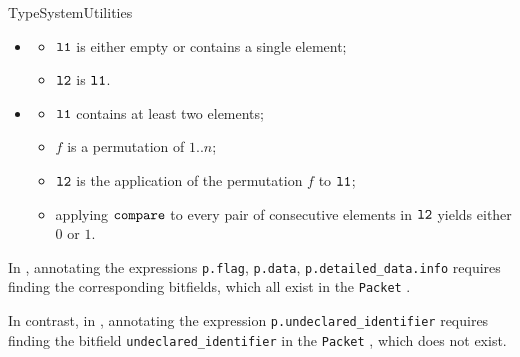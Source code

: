 \begin{TypingRuleList}{TypeSystemUtilities}
\ProseParagraph
\OneApplies
\begin{itemize}
  \item {}
  \begin{itemize}
    \item $\texttt{l1}$ is either empty or contains a single element;
    \item $\texttt{l2}$ is $\texttt{l1}$.
  \end{itemize}

  \item {}
  \begin{itemize}
    \item $\texttt{l1}$ contains at least two elements;
    \item $f$ is a permutation of $1..n$;
    \item $\texttt{l2}$ is the application of the permutation $f$ to $\texttt{l1}$;
    \item applying $\texttt{compare}$ to every pair of consecutive elements in $\texttt{l2}$ yields either $0$ or $1$.
  \end{itemize}
\end{itemize}

\FormallyParagraph
{}


In , annotating the expressions
\verb|p.flag|, \verb|p.data|, \verb|p.detailed_data.info|
requires finding the corresponding bitfields, which all exist in the \verb|Packet| \bitvectortypeterm.

In contrast, in , annotating the expression \verb|p.undeclared_identifier|
requires finding the bitfield \verb|undeclared_identifier| in the \verb|Packet| \bitvectortypeterm,
which does not exist.


\end{TypingRuleList}
